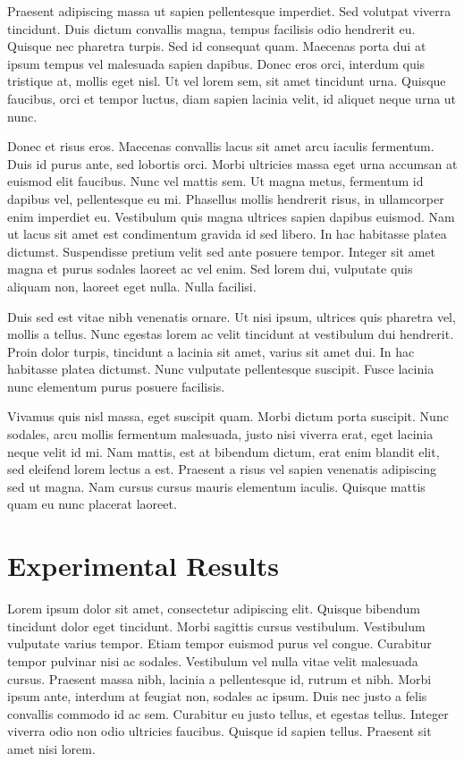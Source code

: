 \documentclass[12pt]{report}
\begin{document}
Praesent adipiscing massa ut sapien pellentesque imperdiet. Sed volutpat viverra tincidunt. Duis dictum convallis magna, tempus facilisis odio hendrerit eu. Quisque nec pharetra turpis. Sed id consequat quam. Maecenas porta dui at ipsum tempus vel malesuada sapien dapibus. Donec eros orci, interdum quis tristique at, mollis eget nisl. Ut vel lorem sem, sit amet tincidunt urna. Quisque faucibus, orci et tempor luctus, diam sapien lacinia velit, id aliquet neque urna ut nunc.

Donec et risus eros. Maecenas convallis lacus sit amet arcu iaculis fermentum. Duis id purus ante, sed lobortis orci. Morbi ultricies massa eget urna accumsan at euismod elit faucibus. Nunc vel mattis sem. Ut magna metus, fermentum id dapibus vel, pellentesque eu mi. Phasellus mollis hendrerit risus, in ullamcorper enim imperdiet eu. Vestibulum quis magna ultrices sapien dapibus euismod. Nam ut lacus sit amet est condimentum gravida id sed libero. In hac habitasse platea dictumst. Suspendisse pretium velit sed ante posuere tempor. Integer sit amet magna et purus sodales laoreet ac vel enim. Sed lorem dui, vulputate quis aliquam non, laoreet eget nulla. Nulla facilisi.

Duis sed est vitae nibh venenatis ornare. Ut nisi ipsum, ultrices quis pharetra vel, mollis a tellus. Nunc egestas lorem ac velit tincidunt at vestibulum dui hendrerit. Proin dolor turpis, tincidunt a lacinia sit amet, varius sit amet dui. In hac habitasse platea dictumst. Nunc vulputate pellentesque suscipit. Fusce lacinia nunc elementum purus posuere facilisis.

Vivamus quis nisl massa, eget suscipit quam. Morbi dictum porta suscipit. Nunc sodales, arcu mollis fermentum malesuada, justo nisi viverra erat, eget lacinia neque velit id mi. Nam mattis, est at bibendum dictum, erat enim blandit elit, sed eleifend lorem lectus a est. Praesent a risus vel sapien venenatis adipiscing sed ut magna. Nam cursus cursus mauris elementum iaculis. Quisque mattis quam eu nunc placerat laoreet.


\chapter{Experimental Results}\label{chap:experimental_results}
Lorem ipsum dolor sit amet, consectetur adipiscing elit. Quisque bibendum tincidunt dolor eget tincidunt. Morbi sagittis cursus vestibulum. Vestibulum vulputate varius tempor. Etiam tempor euismod purus vel congue. Curabitur tempor pulvinar nisi ac sodales. Vestibulum vel nulla vitae velit malesuada cursus. Praesent massa nibh, lacinia a pellentesque id, rutrum et nibh. Morbi ipsum ante, interdum at feugiat non, sodales ac ipsum. Duis nec justo a felis convallis commodo id ac sem. Curabitur eu justo tellus, et egestas tellus. Integer viverra odio non odio ultricies faucibus. Quisque id sapien tellus. Praesent sit amet nisi lorem.
\end{document}
